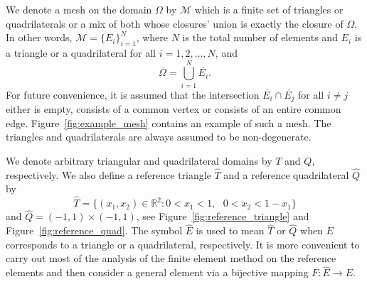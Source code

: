 \documentclass[english, 12pt, a4paper, sci, utf8, a-2b, online]{aaltothesis}
\theoremstyle{definition}
\theoremstyle{plain}
\numberwithin{equation}{section}
\begin{document}
We denote a mesh on the domain $\Omega$ by $\mathcal{M}$
which is a finite set of triangles or quadrilaterals or a mix of both
whose closures' union is exactly the closure of $\Omega$.
In other words, $\mathcal{M} = \{ E_i \}_{i=1}^{N}$, where
$N$ is the total number of elements and
$E_i$ is a triangle or a quadrilateral for all $i=1,2,\dotsc,N$, and
\begin{equation*}
    \overline{\Omega} = \bigcup_{i=1}^{N} \overline{E_i}.
\end{equation*}
For future convenience, it is assumed that the intersection
$\overline{E_i} \cap \overline{E_j}$ for all $i \neq j$
either is empty, consists of a common vertex or consists of an entire common edge.
Figure~\ref{fig:example_mesh} contains an example of such a mesh.
The triangles and quadrilaterals are always assumed to be non-degenerate.
\iffalse
\begin{figure}[t]
    \centering
    \begin{tikzpicture}
        \path[draw] (1,2.5)
            -- (4,0.5)
            -- (6.5,2)
            -- (7,4)
            -- (6.2,5)
            -- (2,5.5)
            -- cycle;
        \path[draw] (3,4) -- (2.8,2.8) -- (4.5,2.5) -- (5,4) -- cycle;
        \path[draw] (1,2.5) -- (2.5,1.5) -- (2.8,2.8) -- cycle;
        \path[draw] (2.5,1.5) -- (5,1.1) -- (4.5,2.5);
        \path[draw] (4.5,2.5) -- (7,4);
        \path[draw] (5,4) -- (6.2,5);
        \path[draw] (5,4) -- (2,5.5);
        \path[draw] (3,4) -- (2,5.5);
    \end{tikzpicture}
    \caption{A finite element mesh.}
    \label{fig:example_mesh}
\end{figure}
\fi

We denote arbitrary triangular and quadrilateral domains by $T$ and $Q$,
respectively. We also define a reference triangle $\widehat{T}$
and a reference quadrilateral $\widehat{Q}$ by
\begin{equation*}
    \widehat{T} = \{ (x_1,x_2) \in \mathbb{R}^2 : 
        0 < x_1 < 1,\text{ } 0 < x_2 < 1 - x_1 \}
\end{equation*}
and $\widehat{Q} = (-1,1) \times (-1,1)$,
see Figure~\ref{fig:reference_triangle} and Figure~\ref{fig:reference_quad}.
The symbol $\widehat{E}$ is used to mean $\widehat{T}$ or $\widehat{Q}$
when $E$ corresponds to a triangle or a quadrilateral, respectively.
It is more convenient to carry out most of the analysis of the finite element
method on the reference elements and then consider a general element
via a bijective mapping $F: \widehat{E} \to E$.
\end{document}
